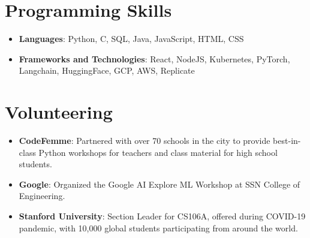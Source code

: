 \documentclass[letterpaper,11pt]{article}
\newcommand{\resumeItem}[2]{
  \item\small{
    \textbf{#1}{: #2 \vspace{-2pt}}
  }
}
\newcommand{\resumeSubHeadingListStart}{\begin{itemize}[leftmargin=*]}
\newcommand{\resumeSubHeadingListEnd}{\end{itemize}}
\begin{document}
\section{Programming Skills}
  \resumeSubHeadingListStart
   \item{
     \textbf{Languages}{: Python, C,  SQL, Java, JavaScript, HTML, CSS}
      }
      \item{
       \textbf{Frameworks and Technologies}{: React, NodeJS, Kubernetes, PyTorch, Langchain, HuggingFace, GCP, AWS, Replicate}
    }
  \resumeSubHeadingListEnd

\section{Volunteering}
\resumeSubHeadingListStart
\resumeItem{CodeFemme}{Partnered with over 70 schools in the city to provide best-in-class Python workshops for teachers and class material for high school students.}
\resumeItem{Google}{Organized the Google AI Explore ML Workshop at SSN College of Engineering.}
\resumeItem{Stanford University}{Section Leader for CS106A, offered during COVID-19 pandemic, with 10,000 global students participating from around the world.}
\resumeSubHeadingListEnd
\end{document}
